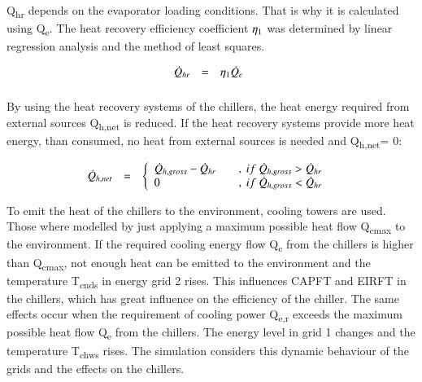 \documentclass[3p,times,procedia,twocolumn,twoside]{elsarticle}
\begin{document}
Q\textsubscript{hr} depends on the evaporator loading conditions. That is why it is calculated using Q\textsubscript{e}. The heat recovery efficiency coefficient  $ \eta\textsubscript{1} $ was determined by linear regression analysis and the method of least squares.

\begin{equation}
\begin{array}{@{}lcl}
\displaystyle 

\dot{Q}_{hr} &=& \eta_{1}\dot{Q}_{e} 

\\[6pt]
\end{array}\vspace*{-12pt}
\end{equation}

By using the heat recovery systems of the chillers, the heat energy required from external sources Q\textsubscript{h,net} is reduced. If the heat recovery systems provide more heat energy, than consumed, no heat from external sources is needed and Q\textsubscript{h,net}= 0:

\begin{equation}
\begin{array}{@{}lcl}
\displaystyle 

\dot{Q}_{h,net} &=&  
\left\{ \begin{array}{lcl}
\dot{Q}_{h,gross} - \dot{Q}_{hr} & &,\ if\ \dot{Q}_{h,gross} > \dot{Q}_{hr} \\ 
0 & &,\ if\ \dot{Q}_{h,gross} < \dot{Q}_{hr}
\end{array}\right.

\\[6pt]
\end{array}\vspace*{-12pt}
\end{equation}

To emit the heat of the chillers to the environment, cooling towers are used. Those where modelled by just applying a maximum possible heat flow Q\textsubscript{cmax} to the environment. If the required cooling energy flow Q\textsubscript{c} from the chillers is higher than Q\textsubscript{cmax}, not enough heat can be emitted to the environment and the temperature T\textsubscript{cnds} in energy grid 2 rises. This influences CAPFT and EIRFT in the chillers, which has great influence on the efficiency of the chiller.
The same effects occur when the requirement of cooling power Q\textsubscript{e,r} exceeds the maximum possible heat flow Q\textsubscript{e} from the chillers. The energy level in grid 1 changes and the temperature T\textsubscript{chws} rises. The simulation considers this dynamic behaviour of the grids and the effects on the chillers.
\end{document}
